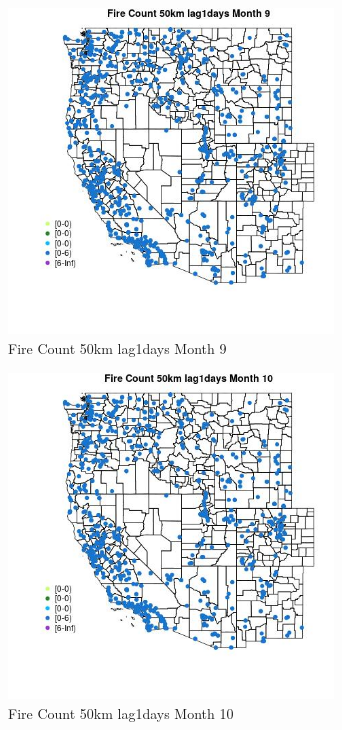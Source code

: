 \begin{figure} 
\centering  
\includegraphics[width=0.77\textwidth]{Code_Outputs/Report_ML_input_PM25_Step4_part_e_de_duplicated_aves_compiled_2019-05-21wNAs_MapObsMo9Fire_Count_50km_lag1days.jpg} 
\caption{\label{fig:Report_ML_input_PM25_Step4_part_e_de_duplicated_aves_compiled_2019-05-21wNAsMapObsMo9Fire_Count_50km_lag1days}Fire Count 50km lag1days Month 9} 
\end{figure} 
 

\begin{figure} 
\centering  
\includegraphics[width=0.77\textwidth]{Code_Outputs/Report_ML_input_PM25_Step4_part_e_de_duplicated_aves_compiled_2019-05-21wNAs_MapObsMo10Fire_Count_50km_lag1days.jpg} 
\caption{\label{fig:Report_ML_input_PM25_Step4_part_e_de_duplicated_aves_compiled_2019-05-21wNAsMapObsMo10Fire_Count_50km_lag1days}Fire Count 50km lag1days Month 10} 
\end{figure} 
 

